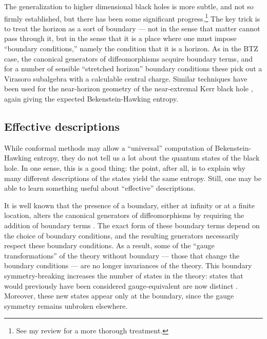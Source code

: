 \documentclass[11pt]{article}
\begin{document}
The generalization to higher dimensional black holes \cite{Carlipcfta,%
Carlipcftb,Carlipcftc} is more subtle, and not so firmly established, but there 
has been some significant progress.\footnote{See my review \cite{Carlipcftd}
for a more thorough treatment.}  The key trick is to treat the horizon as 
a sort of boundary --- not in the sense that matter cannot pass through
it, but in the sense that it is a place where one must impose ``boundary
conditions,'' namely the condition that it is a horizon.  As in the BTZ
case, the canonical generators of diffeomorphisms acquire boundary
terms, and for a number of sensible ``stretched horizon'' boundary
conditions these pick out a Virasoro subalgebra with a calculable central
charge.  Similar techniques have been used for the near-horizon geometry
of the near-extremal Kerr black hole \cite{GHSS}, again giving the expected
Bekenstein-Hawking entropy.

\subsection{Effective descriptions \label{effecta}}

While conformal methods may allow a ``universal'' computation of
Bekenstein-Hawking entropy, they do not tell us a lot about the quantum
states of the black hole.  In one sense, this is a good thing: the point,
after all, is to explain why many different descriptions of the states
yield the same entropy.  Still, one may be able to learn something
useful about ``effective'' descriptions.

It is well known that the presence of a boundary, either at infinity or 
at a finite location, alters the canonical generators of diffeomorphisms 
by requiring the addition of boundary terms \cite{Regge}.   The 
exact form of these boundary terms depend on the choice of boundary 
conditions, and the resulting generators necessarily respect these 
boundary conditions.  As a result, some of the ``gauge transformations''
of the theory without boundary --- those that change the boundary
conditions --- are no longer invariances of the theory.  This boundary
symmetry-breaking increases the number of states in the theory: 
states that would previously have been considered gauge-equivalent
are now distinct \cite{Carlip_wouldbe}.  Moreover, these new states 
appear only at the boundary, since the gauge symmetry remains
unbroken elsewhere.
\end{document}

